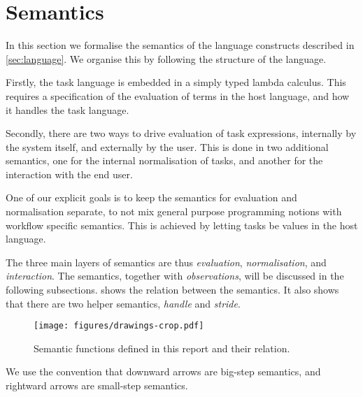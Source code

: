 


\section{Semantics}
\label{sec:semantics}


In this section we formalise the semantics of the language constructs described in \cref{sec:language}.
We organise this by following the structure of the language.

Firstly, the task language is embedded in a simply typed lambda calculus.
This requires a specification of the evaluation of terms in the host language, and how it handles the task language.

Secondly, there are two ways to drive evaluation of task expressions, internally by the system itself, and externally by the user.
This is done in two additional semantics, one for the internal normalisation of tasks, and another for the interaction with the end user.

One of our explicit goals is to keep the semantics for evaluation and normalisation separate,
to not mix general purpose programming notions with workflow specific semantics.
This is achieved by letting tasks be values in the host language.

The three main layers of semantics are thus \emph{evaluation}, \emph{normalisation}, and \emph{interaction}.
The semantics, together with \emph{observations}, will be discussed in the following subsections.
 shows the relation between the semantics.
It also shows that there are two helper semantics, \emph{handle} and \emph{stride}.

\begin{figure}[h]
  \centering
  \texttt{[image: figures/drawings-crop.pdf]}
  \caption{
    Semantic functions defined in this report and their relation.
  }
  \label{fig:semantic-functions}
\end{figure}

We use the convention that downward arrows are big-step semantics, and rightward arrows are small-step semantics.



